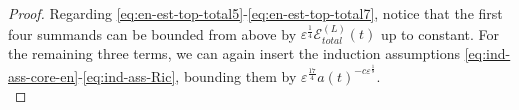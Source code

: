\documentclass[11pt,leqno,textwidth=10cm]{amsart}
\numberwithin{equation}{section}
\theoremstyle{definition}
\theoremstyle{plain}
\newcommand{\1}{\mathbbm{1}}
\newcommand{\E}{\mathcal{E}}
\newcommand{\Ric}{\text{\normalfont{Ric}}}
\renewcommand{\epsilon}{\varepsilon}
\newcommand{\Lap}{\Delta}
\begin{document}
{\begin{proof}

Regarding \eqref{eq:en-est-top-total5}-\eqref{eq:en-est-top-total7}, notice that the first four summands can be bounded from above by $\epsilon^\frac14\E_{total}^{(L)}(t)$ up to constant. For the remaining three terms, we can again insert the induction assumptions \eqref{eq:ind-ass-core-en}-\eqref{eq:ind-ass-Ric}, bounding them by $\epsilon^\frac{17}4a(t)^{-c\epsilon^\frac18}$. \\


\end{proof}}
\end{document}
